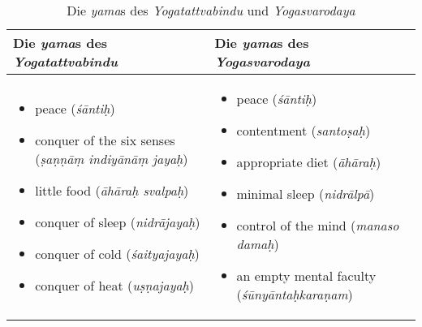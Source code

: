 \footnotesize
\begin{table}[H]
    \footnotesize
\centering
\begin{tabular}{|m{5cm}|m{5cm}|}
\hline
\textbf{Die \textit{yama}s des \textit{Yogatattvabindu}} & \textbf{Die \textit{yama}s des \textit{Yogasvarodaya}} \\
\hline
\begin{itemize}
\item peace (\textit{śāntiḥ})
\item conquer of the six senses (\textit{ṣaṇṇāṃ indiyānāṃ jayaḥ})
\item little food (\textit{āhāraḥ svalpaḥ})
\item conquer of sleep (\textit{nidrājayaḥ})
\item conquer of cold (\textit{śaityajayaḥ})
\item conquer of heat (\textit{uṣṇajayaḥ})
\end{itemize}
&
\begin{itemize}
\item peace (\textit{śāntiḥ})
\item contentment (\textit{santoṣaḥ})
\item appropriate diet (\textit{āhāraḥ})
\item minimal sleep (\textit{nidrālpā})
\item control of the mind (\textit{manaso damaḥ})
\item an empty mental faculty (\textit{śūnyāntaḥkaraṇam})
\end{itemize}
\\
\hline
\end{tabular}
\caption{Die \textit{yama}s des \textit{Yogatattvabindu} und \textit{Yogasvarodaya}}
\normalsize
\end{table}

